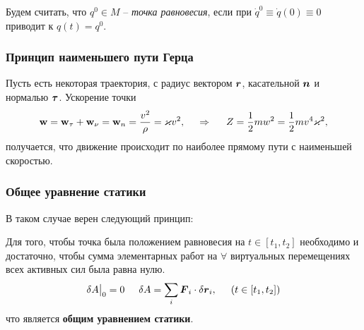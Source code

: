 \begin{to_def} 
    Будем считать, что $q^0 \in M$ -- \textit{точка равновесия}, если при $\dot{q}^0 \equiv \dot{q}(0) \equiv 0$ приводит к $q(t) = q^0$. 
\end{to_def}

\subsubsection*{Принцип наименьшего пути Герца}

Пусть есть некоторая траектория, с радиус вектором $\mbox{\boldmath $r$}$, касательной $\mbox{\boldmath $n$}$ и нормалью $\mbox{\boldmath $\tau$}$. 
Ускорение точки 
\begin{equation*}
    \mbox{\boldmath $\mathrm{w}$} = \mbox{\boldmath $\mathrm{w}$}_\tau + \mbox{\boldmath $\mathrm{w}$}_\nu = \mbox{\boldmath $\mathrm{w}$}_n = 
    \frac{v^2}{\rho} = \varkappa v^2,
    \hspace{0.5cm} \Rightarrow \hspace{0.5cm} 
    Z = \frac{1}{2} m w^2 = \frac{1}{2} m v^4 \varkappa^2,
\end{equation*}
получается, что движение происходит по наиболее прямому пути с наименьшей скоростью.





\subsubsection*{Общее уравнение статики}




В таком случае верен следующий принцип:

\begin{to_thr}
    Для того, чтобы точка была положением равновесия на $t \in [t_1, t_2]$ необходимо и достаточно, чтобы сумма элементарных работ на $\forall$ виртуальных перемещениях всех активных сил была равна нулю.
    \begin{equation}
        \delta A \big|_0 = 0 
        \hspace{0.5cm} 
        \delta A = \sum_i \mbox{\boldmath $F$}_i \cdot \delta \mbox{\boldmath $r$}_i,
        \hspace{0.5cm} (t\in[t_1, t_2])
    \end{equation}
    что является \textbf{общим уравнением статики}.
\end{to_thr}

